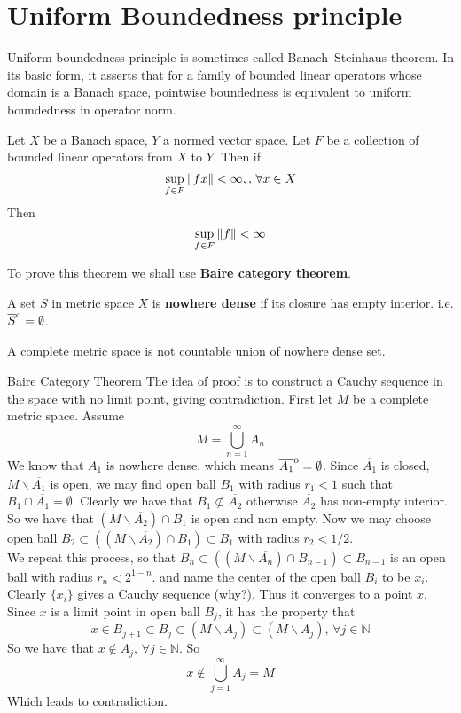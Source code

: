 \newpage
\section{Uniform Boundedness principle}
Uniform boundedness principle is sometimes called Banach–Steinhaus theorem. In its basic form, it asserts that for a family of bounded linear operators  whose domain is a Banach space, pointwise boundedness is equivalent to uniform boundedness in operator norm.

\begin{theorem}\label{UBP}\rm\nextline
	Let $X$ be a Banach space, $Y$ a normed vector space. Let $F$ be a collection of bounded linear operators from $X$ to $Y$. Then if
	$$
		\sup_{f\in F}\left\|{fx}\right\|<\infty,,\,\forall x\in X
	$$
	Then
	$$
		\sup_{f\in F}\left\|{f}\right\|<\infty
	$$
\end{theorem}
To prove this theorem we shall use {\textbf{Baire category theorem}}.

\begin{definition}\rm\nextline
	A set $S$ in metric space $X$ is {\bf nowhere dense} if its closure has empty interior. i.e. $\overline{S}\strut^\mathrm{o}=\emptyset$.
\end{definition}

\begin{theorem}\label{BCT}\rm\nextline
	A complete metric space is not countable union of nowhere dense set.
\begin{pf}{Baire Category Theorem}{}
	The idea of proof is to construct a Cauchy sequence in the space with no limit point, giving contradiction. First let $M$ be a complete metric space. Assume
	$$M=\bigcup_{n=1}^\infty A_n$$
	We know that $A_1$ is nowhere dense, which means $\overline{A_1}\strut^\mathrm{o}=\emptyset$. Since $\overline{A_1}$ is closed, $M\backslash \overline{A_1}$ is open, we may find open ball $B_1$ with radius $r_1<1$ such that $B_1\cap\overline{A_1}=\emptyset$. Clearly we have that $B_1\not\subset\overline{A_2}$ otherwise $\overline{A_2}$ has non-empty interior. So we have that $(M\backslash\overline{A_2})\cap B_1$ is open and non empty. Now we may choose open ball $B_2\subset((M\backslash\overline{A_2})\cap B_1)\subset B_1$ with radius $r_2<1/2$. \\
	We repeat this process, so that $B_n\subset((M\backslash\overline{A_n})\cap B_{n-1})\subset B_{n-1}$ is an  open ball with radius $r_n<2^{1-n}$. and name the center of the open ball $B_i$ to be $x_i$. Clearly $\{x_i\}$ gives a Cauchy sequence (why?). Thus it converges to a point $x$. Since $x$ is a limit point in open ball $B_j$, it has  the property that
	$$x\in \overline{B_{j+1}}\subset B_j\subset (M\backslash\overline{A_j})\subset(M\backslash A_j),\,\forall j\in\mathbb{N}$$
	So we have that $x\not\in A_j,\,\forall j\in\mathbb{N}$.
	So
	$$
		x\not\in \bigcup_{j=1}^{\infty}A_j=M
	$$
	Which leads to contradiction.
	\end{pf}
\end{theorem}

